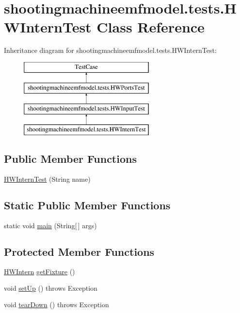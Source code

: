\hypertarget{classshootingmachineemfmodel_1_1tests_1_1_h_w_intern_test}{\section{shootingmachineemfmodel.\-tests.\-H\-W\-Intern\-Test Class Reference}
\label{classshootingmachineemfmodel_1_1tests_1_1_h_w_intern_test}
}
Inheritance diagram for shootingmachineemfmodel.\-tests.\-H\-W\-Intern\-Test\-:\begin{figure}[H]
\begin{center}
\leavevmode
\includegraphics[height=4.000000cm]{classshootingmachineemfmodel_1_1tests_1_1_h_w_intern_test}
\end{center}
\end{figure}
\subsection*{Public Member Functions}
\begin{DoxyCompactItemize}
\item 
\hyperlink{classshootingmachineemfmodel_1_1tests_1_1_h_w_intern_test_aa2c36926e8579e043b563c5c88f9b934}{H\-W\-Intern\-Test} (String name)
\end{DoxyCompactItemize}
\subsection*{Static Public Member Functions}
\begin{DoxyCompactItemize}
\item 
static void \hyperlink{classshootingmachineemfmodel_1_1tests_1_1_h_w_intern_test_a0897237620ee4d614a2b64f7a846f964}{main} (String\mbox{[}$\,$\mbox{]} args)
\end{DoxyCompactItemize}
\subsection*{Protected Member Functions}
\begin{DoxyCompactItemize}
\item 
\hyperlink{interfaceshootingmachineemfmodel_1_1_h_w_intern}{H\-W\-Intern} \hyperlink{classshootingmachineemfmodel_1_1tests_1_1_h_w_intern_test_abc4596db5ffdd34386ede57d54221959}{get\-Fixture} ()
\item 
void \hyperlink{classshootingmachineemfmodel_1_1tests_1_1_h_w_intern_test_a0f953d7b988bb8eea8da78a5f4d50688}{set\-Up} ()  throws Exception 
\item 
void \hyperlink{classshootingmachineemfmodel_1_1tests_1_1_h_w_intern_test_abc05f385c0389be9cd3b452d08df541d}{tear\-Down} ()  throws Exception 
\end{DoxyCompactItemize}
